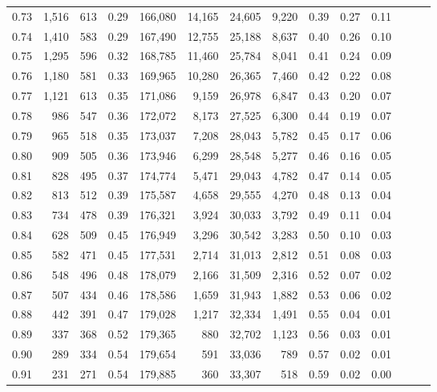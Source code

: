 \begin{tabular}{rrrrrrrrrrrrrr}
0.73 &  1,516 &  613 &  0.29 &  166,080 &   14,165 &  24,605 &   9,220 &  0.39 &  0.27 &      0.11 \\
0.74 &  1,410 &  583 &  0.29 &  167,490 &   12,755 &  25,188 &   8,637 &  0.40 &  0.26 &      0.10 \\
0.75 &  1,295 &  596 &  0.32 &  168,785 &   11,460 &  25,784 &   8,041 &  0.41 &  0.24 &      0.09 \\
0.76 &  1,180 &  581 &  0.33 &  169,965 &   10,280 &  26,365 &   7,460 &  0.42 &  0.22 &      0.08 \\
0.77 &  1,121 &  613 &  0.35 &  171,086 &    9,159 &  26,978 &   6,847 &  0.43 &  0.20 &      0.07 \\
0.78 &    986 &  547 &  0.36 &  172,072 &    8,173 &  27,525 &   6,300 &  0.44 &  0.19 &      0.07 \\
0.79 &    965 &  518 &  0.35 &  173,037 &    7,208 &  28,043 &   5,782 &  0.45 &  0.17 &      0.06 \\
0.80 &    909 &  505 &  0.36 &  173,946 &    6,299 &  28,548 &   5,277 &  0.46 &  0.16 &      0.05 \\
0.81 &    828 &  495 &  0.37 &  174,774 &    5,471 &  29,043 &   4,782 &  0.47 &  0.14 &      0.05 \\
0.82 &    813 &  512 &  0.39 &  175,587 &    4,658 &  29,555 &   4,270 &  0.48 &  0.13 &      0.04 \\
0.83 &    734 &  478 &  0.39 &  176,321 &    3,924 &  30,033 &   3,792 &  0.49 &  0.11 &      0.04 \\
0.84 &    628 &  509 &  0.45 &  176,949 &    3,296 &  30,542 &   3,283 &  0.50 &  0.10 &      0.03 \\
0.85 &    582 &  471 &  0.45 &  177,531 &    2,714 &  31,013 &   2,812 &  0.51 &  0.08 &      0.03 \\
0.86 &    548 &  496 &  0.48 &  178,079 &    2,166 &  31,509 &   2,316 &  0.52 &  0.07 &      0.02 \\
0.87 &    507 &  434 &  0.46 &  178,586 &    1,659 &  31,943 &   1,882 &  0.53 &  0.06 &      0.02 \\
0.88 &    442 &  391 &  0.47 &  179,028 &    1,217 &  32,334 &   1,491 &  0.55 &  0.04 &      0.01 \\
0.89 &    337 &  368 &  0.52 &  179,365 &      880 &  32,702 &   1,123 &  0.56 &  0.03 &      0.01 \\
0.90 &    289 &  334 &  0.54 &  179,654 &      591 &  33,036 &     789 &  0.57 &  0.02 &      0.01 \\
0.91 &    231 &  271 &  0.54 &  179,885 &      360 &  33,307 &     518 &  0.59 &  0.02 &      0.00 \\

\end{tabular}
